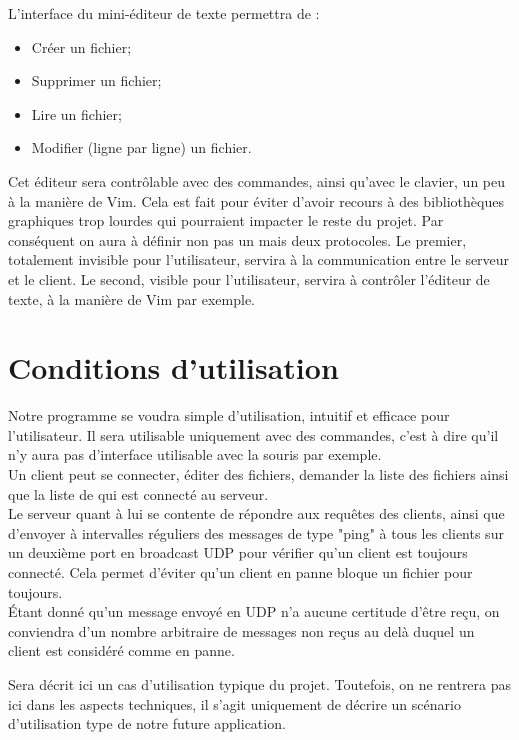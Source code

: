 \documentclass[12pt]{article}
\begin{document}
L'interface du mini-éditeur de texte permettra de :
\begin{itemize}
\item Créer un fichier;
\item Supprimer un fichier;
\item Lire un fichier;
\item Modifier (ligne par ligne) un fichier.\\
\end{itemize}
Cet éditeur sera contrôlable avec des commandes, ainsi qu'avec le clavier, un peu à la manière de Vim. Cela est fait pour éviter d'avoir recours à des bibliothèques graphiques trop lourdes qui pourraient impacter le reste du projet.
Par conséquent on aura à définir non pas un mais deux protocoles. Le premier, totalement invisible pour l'utilisateur, servira à la communication entre le serveur et le client. Le second, visible pour l'utilisateur, servira à contrôler l'éditeur de texte, à la manière de Vim par exemple.

\section{Conditions d'utilisation}
Notre programme se voudra simple d'utilisation, intuitif et efficace pour l'utilisateur. Il sera utilisable uniquement avec des commandes, c'est à dire qu'il n'y aura pas d'interface utilisable avec la souris par exemple.\\

Un client peut se connecter, éditer des fichiers, demander la liste des fichiers ainsi que la liste de qui est connecté au serveur.\\
Le serveur quant à lui se contente de répondre aux requêtes des clients, ainsi que d'envoyer à intervalles réguliers des messages de type "ping" à tous les clients sur un deuxième port en broadcast UDP pour vérifier qu'un client est toujours connecté. Cela permet d'éviter qu'un client en panne bloque un fichier pour toujours.\\
\'Etant donné qu'un message envoyé en UDP n'a aucune certitude d'être reçu, on conviendra d'un nombre arbitraire de messages non reçus au delà duquel un client est considéré comme en panne.

Sera décrit ici un cas d'utilisation typique du projet. Toutefois, on ne rentrera pas ici dans les aspects techniques, il s'agit uniquement de décrire un scénario d'utilisation type de notre future application.\\
\end{document}
